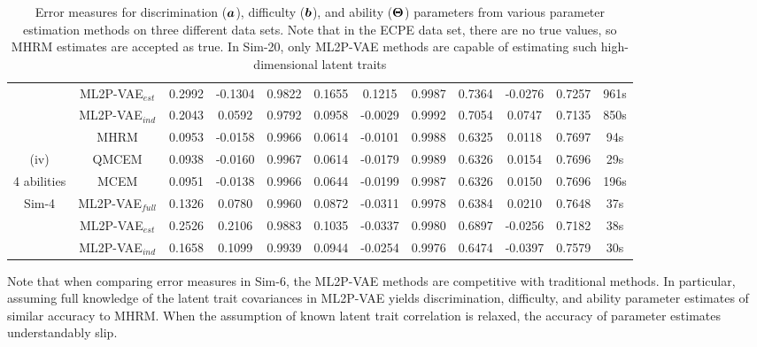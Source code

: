 \begin{table}
{\begin{tabular}{c|c|ccc|ccc|ccc|c}
& ML2P-VAE$_{est}$ & 0.2992  & -0.1304  & 0.9822  & 0.1655 &  0.1215  & 0.9987  & 0.7364   & -0.0276  & 0.7257 & 961s \\
& ML2P-VAE$_{ind}$ & 0.2043 &   0.0592  & 0.9792  & 0.0958   & -0.0029  & 0.9992  & 0.7054 &  0.0747  & 0.7135 & 850s \\
\hline 
        & MHRM & 0.0953 & -0.0158	&	0.9966 & 0.0614 & -0.0101 &	0.9988 & 0.6325	& 0.0118	& 0.7697 & 94s \\
        (iv)& QMCEM & 0.0938 & -0.0160	&	0.9967 & 0.0614 & -0.0179 &	0.9989 & 0.6326	& 0.0154	& 0.7696 & 29s \\
        4 abilities & MCEM & 0.0951 & -0.0138	&	0.9966 & 0.0644 & -0.0199 &	0.9987 & 0.6326	& 0.0150	& 0.7696 & 196s \\
       Sim-4 & ML2P-VAE$_{full}$ & 0.1326 & 0.0780		&	0.9960 & 0.0872 & -0.0311 &	0.9978 & 0.6384	& 0.0210	& 0.7648 & 37s \\
        & ML2P-VAE$_{est}$ & 0.2526 & 0.2106		&	0.9883 & 0.1035 & -0.0337 &	0.9980 & 0.6897	& -0.0256 	& 0.7182 & 38s \\
        & ML2P-VAE$_{ind}$ & 0.1658 & 0.1099		&	0.9939 & 0.0944 & -0.0254 &	0.9976 & 0.6474	& -0.0397	& 0.7579 & 30s \\

\hline
\end{tabular}
\caption{Error measures for discrimination ($\boldsymbol{a}$), difficulty ($\boldsymbol{b}$), and ability ($\boldsymbol{\Theta}$) parameters from various parameter estimation methods on three different data sets. Note that in the ECPE data set, there are no true values, so MHRM estimates are accepted as true. In Sim-20, only ML2P-VAE methods are capable of estimating such high-dimensional latent traits}
  \label{tab:ml2p_results}
}
\end{table}

Note that when comparing error measures in Sim-6, the ML2P-VAE methods are competitive with traditional methods. In particular, assuming full knowledge of the latent trait covariances in ML2P-VAE yields discrimination, difficulty, and ability parameter estimates of similar accuracy to MHRM. When the assumption of known latent trait correlation is relaxed, the accuracy of parameter estimates understandably slip.

